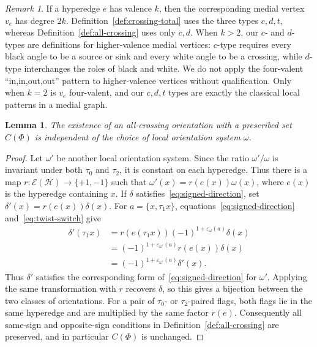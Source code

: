 \documentclass[10pt,a4paper]{article}
\newtheorem{lemma}[theorem]{Lemma}
\theoremstyle{definition}
\theoremstyle{remark}
\newtheorem{remark}[theorem]{Remark}
\newcommand{\Hcal}{\mathcal{H}}
\newcommand{\Ecal}{\mathcal{E}}
\begin{document}
\begin{remark}\label{rem:high-valence}
If a hyperedge $e$ has valence $k$, then the corresponding medial vertex $v_e$ has degree $2k$. Definition~\ref{def:crossing-total} uses the three types $c,d,t$, whereas Definition~\ref{def:all-crossing} uses only $c,d$. When $k>2$, our $c$- and $d$-types are definitions for higher-valence medial vertices: $c$-type requires every black angle to be a source or sink and every white angle to be a crossing, while $d$-type interchanges the roles of black and white. We do not apply the four-valent ``in,in,out,out'' pattern to higher-valence vertices without qualification. Only when $k=2$ is $v_e$ four-valent, and our $c,d,t$ types are exactly the classical local patterns in a medial graph.
\end{remark}

\begin{lemma}\label{lem:choice-independent}
The existence of an all-crossing orientation with a prescribed set $C(\Phi)$ is independent of the choice of local orientation system $\omega$.
\end{lemma}

\begin{proof}
Let $\omega'$ be another local orientation system. Since the ratio $\omega'/\omega$ is invariant under both $\tau_0$ and $\tau_2$, it is constant on each hyperedge. Thus there is a map $r:\Ecal(\Hcal)\to\{+1,-1\}$ such that $\omega'(x)=r(e(x))\omega(x)$, where $e(x)$ is the hyperedge containing $x$. If $\delta$ satisfies~\eqref{eq:signed-direction}, set $\delta'(x)=r(e(x))\delta(x)$. For $a=\{x,\tau_1x\}$, equations~\eqref{eq:signed-direction} and~\eqref{eq:twist-switch} give
\[
\begin{aligned}
 \delta'(\tau_1x)
 &=r(e(\tau_1x))(-1)^{1+\varepsilon_\omega(a)}\delta(x)\\
 &=(-1)^{1+\varepsilon_{\omega'}(a)}r(e(x))\delta(x)\\
 &=(-1)^{1+\varepsilon_{\omega'}(a)}\delta'(x).
\end{aligned}
\]
Thus $\delta'$ satisfies the corresponding form of~\eqref{eq:signed-direction} for $\omega'$. Applying the same transformation with $r$ recovers $\delta$, so this gives a bijection between the two classes of orientations. For a pair of $\tau_0$- or $\tau_2$-paired flags, both flags lie in the same hyperedge and are multiplied by the same factor $r(e)$. Consequently all same-sign and opposite-sign conditions in Definition~\ref{def:all-crossing} are preserved, and in particular $C(\Phi)$ is unchanged.
\end{proof}
\end{document}
